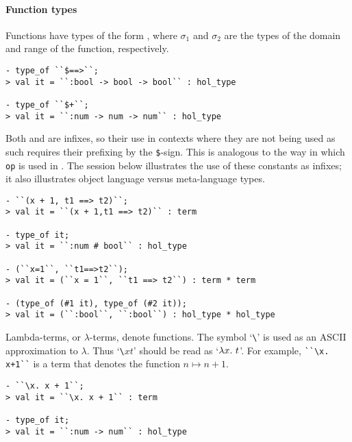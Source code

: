 \paragraph{Function types}

Functions have types of the form ,
where $\sigma_1$ and $\sigma_2$ are the types of the domain and
range of the function, respectively.

\begin{session}\begin{verbatim}
- type_of ``$==>``;
> val it = ``:bool -> bool -> bool`` : hol_type

- type_of ``$+``;
> val it = ``:num -> num -> num`` : hol_type
\end{verbatim}\end{session}

\noindent Both \ml{+} and \ml{==>} are infixes, so their use in
contexts where they are not being used as such requires their
prefixing by the \texttt{\$}-sign.  This is analogous to the way in
which \texttt{op} is used in \ML. The session below illustrates the
use of these constants as infixes; it also illustrates object language
versus meta-language types.

\begin{session}\begin{verbatim}
- ``(x + 1, t1 ==> t2)``;
> val it = ``(x + 1,t1 ==> t2)`` : term

- type_of it;
> val it = ``:num # bool`` : hol_type

- (``x=1``, ``t1==>t2``);
> val it = (``x = 1``, ``t1 ==> t2``) : term * term

- (type_of (#1 it), type_of (#2 it));
> val it = (``:bool``, ``:bool``) : hol_type * hol_type
\end{verbatim}\end{session}

Lambda-terms, or $\lambda$-terms, denote functions. The symbol
    `{\small\verb|\|}' is used as an {\small ASCII} approximation to
    $\lambda$.  Thus `{\small\verb|\|}$x$$t$' should be read as
    `$\lambda x.\ t$'. For example, {\small\verb|``\x. x+1``|} is a term
    that denotes the function $n\mapsto n{+}1$.

\begin{session}\begin{verbatim}
- ``\x. x + 1``;
> val it = ``\x. x + 1`` : term

- type_of it;
> val it = ``:num -> num`` : hol_type
\end{verbatim}\end{session}

